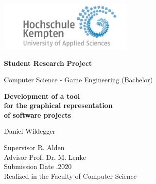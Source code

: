\thispagestyle{empty}



\vspace*{-20mm}
\begin{flushright}
\includegraphics[width=0.5\textwidth]{Bilder/LogoHS.png}
\end{flushright}


\vspace*{2cm}

\begin{center}
{\Large \textbf{Student Research Project}}\\ 

\vspace*{1cm}

{\large Computer Science - Game Engineering (Bachelor)\\[1mm]}

\vspace{1cm}

{\Large \bfseries Development of a tool \\
				  for the graphical representation \\
				  of software projects \\}


\vspace{1.5cm}

{\large Daniel Wildegger}\\[40mm]

\end{center}

\vfill

\parbox{120mm}{
\begin{tabbing}
Supervisor \hspace{1.2cm}    \= R. Alden\\
Advisor						\> Prof. Dr. M. Lenke\\
Submission Date             .2020 \\
Realized in the             \> Faculty of Computer Science\\[4mm]
\end{tabbing}
}


